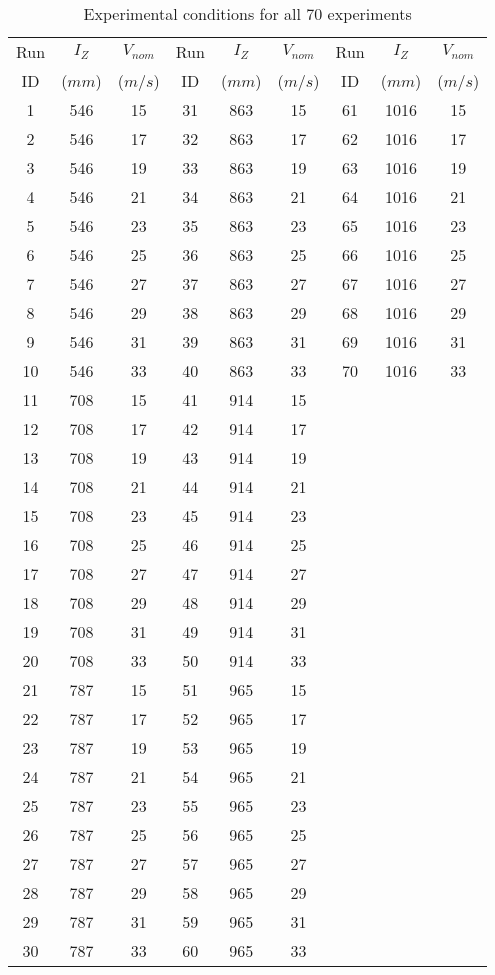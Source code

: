 \begin{table}[H]
\begin{center}
\begin{tabular}{|ccc||ccc||ccc|}
	\hline
	Run & $I_Z$  & $V_{nom}$ & Run & $I_Z$  & $V_{nom}$ & Run & $I_Z$  & $V_{nom}$\\
	ID & ($mm$) & ($m/s$) & ID & ($mm$) & ($m/s$) & ID & ($mm$) & ($m/s$)\\
	\hline
	1 & 546 & 15 & 31 & 863 & 15 & 61 & 1016 & 15\\
	2 & 546 & 17 & 32 & 863 & 17 & 62 & 1016 & 17\\
	3 & 546 & 19 & 33 & 863 & 19 & 63 & 1016 & 19\\
	4 & 546 & 21 & 34 & 863 & 21 & 64 & 1016 & 21\\
	5 & 546 & 23 & 35 & 863 & 23 & 65 & 1016 & 23\\
	6 & 546 & 25 & 36 & 863 & 25 & 66 & 1016 & 25\\
	7 & 546 & 27 & 37 & 863 & 27 & 67 & 1016 & 27\\
	8 & 546 & 29 & 38 & 863 & 29 & 68 & 1016 & 29\\
	9 & 546 & 31 & 39 & 863 & 31 & 69 & 1016 & 31\\
	10 & 546 & 33 & 40 & 863 & 33 & 70 & 1016 & 33\\
	11 & 708 & 15 & 41 & 914 & 15 &   &   &  \\
	12 & 708 & 17 & 42 & 914 & 17 &   &   &  \\
	13 & 708 & 19 & 43 & 914 & 19 &   &   &  \\
	14 & 708 & 21 & 44 & 914 & 21 &   &   &  \\
	15 & 708 & 23 & 45 & 914 & 23 &   &   &  \\
	16 & 708 & 25 & 46 & 914 & 25 &   &   &  \\
	17 & 708 & 27 & 47 & 914 & 27 &   &   &  \\
	18 & 708 & 29 & 48 & 914 & 29 &   &   &  \\
	19 & 708 & 31 & 49 & 914 & 31 &   &   &  \\
	20 & 708 & 33 & 50 & 914 & 33 &   &   &  \\
	21 & 787 & 15 & 51 & 965 & 15 &   &   &  \\
	22 & 787 & 17 & 52 & 965 & 17 &   &   &  \\
	23 & 787 & 19 & 53 & 965 & 19 &   &   &  \\
	24 & 787 & 21 & 54 & 965 & 21 &   &   &  \\
	25 & 787 & 23 & 55 & 965 & 23 &   &   &  \\
	26 & 787 & 25 & 56 & 965 & 25 &   &   &  \\
	27 & 787 & 27 & 57 & 965 & 27 &   &   &  \\
	28 & 787 & 29 & 58 & 965 & 29 &   &   &  \\
	29 & 787 & 31 & 59 & 965 & 31 &   &   &  \\
	30 & 787 & 33 & 60 & 965 & 33 &   &   &  \\
	\hline
\end{tabular}
\caption{Experimental conditions for all 70 experiments}
\label{table:test_matrix_table}
\end{center}
\end{table}
